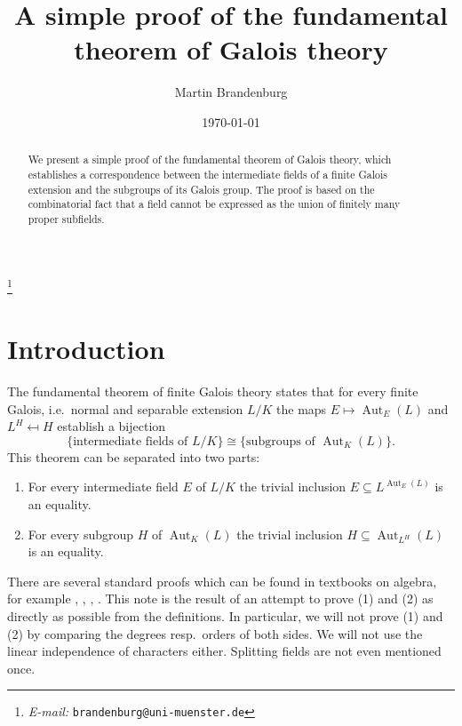 \documentclass[11pt,reqno]{amsart}
\theoremstyle{standard}
\theoremstyle{definition}
\DeclareMathOperator{\Aut}{Aut}
\begin{document}

\begin{abstract}
We present a simple proof of the fundamental theorem of Galois theory, which establishes a correspondence between the intermediate fields of a finite Galois extension and the subgroups of its Galois group. The proof is based on the combinatorial fact that a field cannot be expressed as the union of finitely many proper subfields.
\end{abstract}


\title[A simple proof of the fundamental theorem of Galois theory]{A simple proof of the fundamental\\theorem of Galois theory}
\author{Martin Brandenburg}
\thanks{\emph{E-mail:} \texttt{brandenburg@uni-muenster.de}}
\date{\today}

\maketitle


\section{Introduction}

The fundamental theorem of finite Galois theory states that for every finite Galois, i.e.\ normal and separable extension $L/K$ the maps $E \mapsto \Aut_E(L)$ and $L^H \mapsfrom H$ establish a bijection
\[\bigl\{\text{intermediate fields of } L/K\bigr\} \cong \bigl\{\text{subgroups of } \Aut_K(L)\bigr\}.\]
This theorem can be separated into two parts:
\begin{enumerate}
\item For every intermediate field $E$ of $L/K$ the trivial inclusion ${E \subseteq L^{\Aut_E(L)}}$ is an equality.
\item For every subgroup $H$ of $\Aut_K(L)$ the trivial inclusion $H \subseteq \Aut_{L^H}(L)$ is an equality.
\end{enumerate}
There are several standard proofs which can be found in textbooks on algebra, for example \cite[Thm.\ 16]{Artin}, \cite[Thm.\ V.§33.4]{Bourbaki}, \cite[Thm.\ 14.14]{Dummit}, \cite[Thm.\ VII.6.9]{Aluffi}. This note is the result of an attempt to prove (1) and (2) as directly as possible from the definitions. In particular, we will not prove (1) and (2) by comparing the degrees resp.\ orders of both sides. We will not use the linear independence of characters either. Splitting fields are not even mentioned once.
\end{document}

